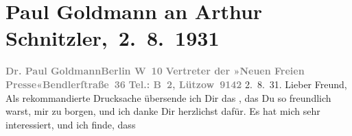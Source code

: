 

         
         \renewcommand{\erwaehntePersonen}{Personen: Paul Goldmann, Eva Marie Goldmann}
         \renewcommand{\erwaehnteInstitutionen}{Institutionen: Neue Freie Presse}
         \renewcommand{\erwaehnteOrte}{Orte: Bendlerstraße, Berlin, Velden am Wörthersee, Wien}
         \renewcommand{\erwaehnteWerke}{Werke: ?? [Roman mit erotischen Schilderungen]}
               \section[ Paul Goldmann an Arthur Schnitzler, 2. 8. 1931]{ Paul Goldmann an Arthur Schnitzler, 2. 8. 1931}\nopagebreak{}\rehead{ }\begin{ledgroupsized}[t]{13cm}\normalsize\beginnumbering{} \toendnotes[C]{\smallbreak\pagebreak[2]} 
\toendnotes[C]{\smallbreak}\pstart
           \noindent{}{\pb}\textcolor{gray}{\textbf{Dr. Paul Goldmann}}\hfill \textcolor{gray}{\textbf{Berlin W 10}}\pend
           \pstart
           \textcolor{gray}{\textbf{Vertreter der »Neuen Freien
                           Presse«}}\hfill \textcolor{gray}{\textbf{Bendlerſtraße 36}}\pend
           \pstart
           \raggedleft{}\textcolor{gray}{\textbf{Tel.: B 2, Lützow 9142}}\pend
           \pstart
           \raggedleft{}2. 8. 31.\pend
           \pstart\center{}Lieber Freund,\pend\pstart
           Als rekommandierte Drucksache übersende ich Dir das \label{K_L03518-1v}\label{K_L03518-1h}, das Du so freundlich warst, mir zu borgen, und ich danke Dir herzlich\introOben{}st\introOben{} dafür. Es hat mich sehr interessiert, und ich finde, dass

\end{ledgroupsized}
